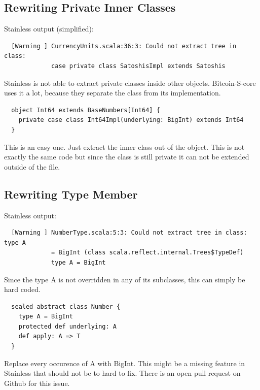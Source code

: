 \subsection{Rewriting Private Inner Classes}
Stainless output (simplified):
\begin{lstlisting}
  [Warning ] CurrencyUnits.scala:36:3: Could not extract tree in class:
             case private class SatoshisImpl extends Satoshis
\end{lstlisting}
Stainless is not able to extract private classes inside other objects.
Bitcoin-S-core uses it a lot, because they separate the class from its implementation.
\begin{lstlisting}
  object Int64 extends BaseNumbers[Int64] {
    private case class Int64Impl(underlying: BigInt) extends Int64 
  }
\end{lstlisting}
This is an easy one.
Just extract the inner class out of the object.
This is not exactly the same code but since the class is still private it can not be extended outside of the file.

\subsection{Rewriting Type Member}
Stainless output:
\begin{lstlisting}
  [Warning ] NumberType.scala:5:3: Could not extract tree in class: type A
             = BigInt (class scala.reflect.internal.Trees$TypeDef)
             type A = BigInt
\end{lstlisting}
Since the type A is not overridden in any of its subclasses, this can simply be hard coded.
\begin{lstlisting}
  sealed abstract class Number {
    type A = BigInt
    protected def underlying: A
    def apply: A => T
  }
\end{lstlisting}
Replace every occurence of A with BigInt.
This might be a missing feature in Stainless that should not be to hard to fix.
There is an open pull request  on Github for this issue.

